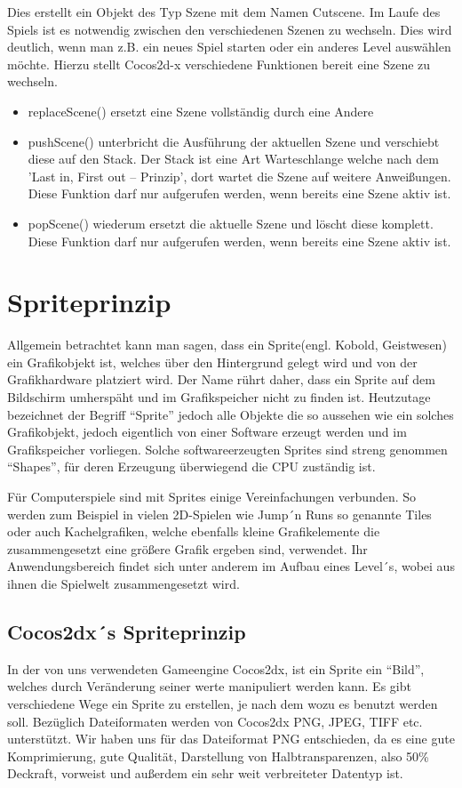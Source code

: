 Dies erstellt ein Objekt des Typ Szene mit dem Namen Cutscene.
Im Laufe des Spiels ist es  notwendig zwischen den verschiedenen Szenen zu wechseln. Dies wird deutlich, wenn man z.B. ein neues Spiel starten oder ein anderes Level auswählen möchte. Hierzu stellt Cocos2d-x verschiedene Funktionen bereit eine Szene zu wechseln.

\begin{itemize}
\item replaceScene() ersetzt eine Szene vollständig durch eine Andere
\item pushScene() unterbricht die Ausführung der aktuellen Szene und verschiebt diese auf den Stack. Der Stack ist eine Art Warteschlange welche nach dem 'Last in, First out – Prinzip', dort wartet die Szene auf weitere Anweißungen. Diese Funktion darf nur aufgerufen werden, wenn bereits eine Szene aktiv ist.
\item popScene() wiederum ersetzt die aktuelle Szene und löscht diese komplett. Diese Funktion darf nur aufgerufen werden, wenn bereits eine Szene aktiv ist.
\end{itemize}



\section{Spriteprinzip}
Allgemein betrachtet kann man sagen, dass ein Sprite(engl. Kobold, Geistwesen) ein Grafikobjekt ist, welches über den Hintergrund gelegt wird und von der Grafikhardware platziert wird. 
Der Name rührt daher, dass ein Sprite auf dem Bildschirm umherspäht und im Grafikspeicher nicht zu finden ist. Heutzutage bezeichnet der Begriff “Sprite” jedoch alle Objekte die so aussehen wie ein solches Grafikobjekt, jedoch eigentlich von einer Software erzeugt werden und im Grafikspeicher vorliegen. 
Solche softwareerzeugten Sprites sind streng genommen “Shapes”, für deren Erzeugung überwiegend die CPU zuständig ist.
 
Für Computerspiele sind mit Sprites einige Vereinfachungen verbunden. So werden zum Beispiel in vielen 2D-Spielen wie Jump´n Runs so genannte Tiles oder auch Kachelgrafiken, welche ebenfalls kleine Grafikelemente die zusammengesetzt eine größere Grafik ergeben sind, verwendet. Ihr Anwendungsbereich findet sich unter anderem im Aufbau eines Level´s, wobei aus ihnen die Spielwelt zusammengesetzt wird.

\subsection{Cocos2dx´s Spriteprinzip}
In der von uns verwendeten Gameengine Cocos2dx, ist ein Sprite ein “Bild”, welches durch Veränderung seiner werte manipuliert werden kann. Es gibt verschiedene Wege ein Sprite zu erstellen, je nach dem wozu es benutzt werden soll. Bezüglich Dateiformaten werden von Cocos2dx PNG, JPEG, TIFF etc. unterstützt. Wir haben uns für das Dateiformat PNG entschieden, da es eine gute Komprimierung, gute Qualität, Darstellung von Halbtransparenzen, also 50\% Deckraft, vorweist und außerdem ein sehr weit verbreiteter Datentyp ist.

